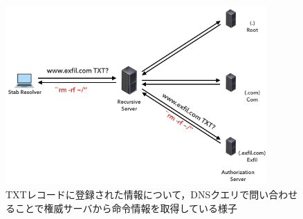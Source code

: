 \begin{figure}[h]
 \centering
 \includegraphics[width=10.0cm]{figure/dns-infiltration.png}
 \caption{TXTレコードに登録された情報について，DNSクエリで問い合わせることで権威サーバから命令情報を取得している様子}
 \label{fig:dns-infiltration}
\end{figure}



